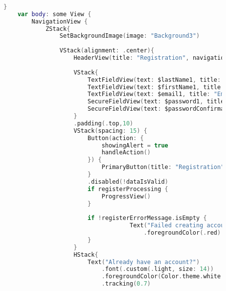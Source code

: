\hspace{-10mm}
\begin{minipage}{\textwidth}
    \linespread{0.8}\selectfont
    \begin{lstlisting}[language=swift]
        
        }
            var body: some View {
                NavigationView {
                    ZStack{
                        SetBackgroundImage(image: "Background3")
                        
                        VStack(alignment: .center){
                            HeaderView(title: "Registration", navigationPage: .welcomePage, arrowVisibility: true)
                            
                            VStack{
                                TextFieldView(text: $lastName1, title: "Last name")
                                TextFieldView(text: $firstName1, title: "First name")
                                TextFieldView(text: $email1, title: "Email")    
                                SecureFieldView(text: $password1, title: "Password")
                                SecureFieldView(text: $passwordConfirmation1, title: "Password confirmation")
                            }
                            .padding(.top,10)
                            VStack(spacing: 15) {
                                Button(action: {
                                    showingAlert = true
                                    handleAction()
                                }) {
                                    PrimaryButton(title: "Registration", fontColor: Color.theme.white, backgroundColor: buttonColor)
                                }
                                .disabled(!dataIsValid)
                                if registerProcessing {
                                    ProgressView()
                                }
                                
                                if !registerErrorMessage.isEmpty {
                                            Text("Failed creating account: \(registerErrorMessage)")
                                                .foregroundColor(.red)
                                }
                            }
                            HStack{
                                Text("Already have an account?")
                                    .font(.custom(.light, size: 14))
                                    .foregroundColor(Color.theme.white.opacity(0.7))
                                    .tracking(0.7)
                                

\end{lstlisting}
\end{minipage}

